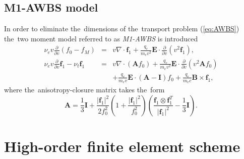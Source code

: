\documentclass[review]{elsarticle}
\newcommand{\pdv}[2]{\frac{\partial{#1}}{\partial{#2}}}
\newcommand{\vect}[1]{\boldsymbol{#1}}
\newcommand{\matr}[1]{\mathbf{#1}}
\newcommand{\nue}{\nu_{e}}
\newcommand{\nutot}{\nu_{t}}
\newcommand{\vmag}{v}
\newcommand{\E}{\vect{E}}
\newcommand{\B}{\vect{B}}
\newcommand{\qe}{q_e}
\newcommand{\me}{m_e}
\newcommand{\fM}{f_M}
\newcommand{\fzero}{f_0}
\newcommand{\fone}{\vect{f}_1}
\newcommand{\MI}{\matr{I}}
\newcommand{\MA}{\matr{A}}
\renewcommand{\refeq}[1]{(\ref{#1})}
\begin{document}
\subsection{M1-AWBS model}
In order to eliminate the~dimensions of the~transport problem \refeq{eq:AWBS}
the~two moment model referred to as \textit{M1-AWBS} is introduced
\begin{eqnarray}
  \nue\vmag\pdv{}{\vmag}\left(\fzero - \fM \right) &=&
  \vmag\nabla\cdot\fone + \frac{\qe}{\me\vmag^2}\E\cdot\pdv{}{\vmag}
  \left( \vmag^2 \fone\right) , 
  \label{eq:M1f0}\\
  \nue\vmag\pdv{}{\vmag}\fone - \nutot\fone &=& 
  \vmag\nabla\cdot\left(\MA\fzero\right) + 
  \frac{\qe}{\me\vmag^2}\E\cdot\pdv{}{\vmag}
  \left( \vmag^2 \MA\fzero\right) \nonumber\\
  && + \frac{\qe}{\me\vmag}\E\cdot\left( \MA - \MI \right)\fzero +
  \frac{\qe}{\me c}\B\times\fone ,
  \label{eq:M1f1}
\end{eqnarray}
where the~anisotropy-closure matrix takes the~form
\begin{equation}
  \MA = \frac{1}{3}\MI + \frac{|\fone|^2}{2\fzero^2}
  \left( 1 + \frac{|\fone|^2}{\fzero^2} \right)
  \left( \frac{\fone\otimes\fone^T}{|\fone|^2} - \frac{1}{3}\MI\right) .
\end{equation}
\section{High-order finite element scheme}\label{sec:hos}
\begin{comment}
\begin{eqnarray}
  \rho \pdv{\fzero}{\vmag} &=& 
  \frac{\rho}{\nue}\MI:\nabla\fone + 
  \frac{\qe\rho}{\me\nue\vmag}\E\cdot\pdv{\fone}{\vmag}
  + \frac{2 \qe\rho}{\me\nue\vmag^2}\E\cdot\fone + \rho \pdv{\fM}{\vmag} , 
  \label{eq:M1hosf0}\\
  \rho \pdv{\fone}{\vmag} &=&
  \nabla\cdot\left(\frac{\rho\MA}{\nue}\fzero\right) +
  \left(\frac{\qe\rho}{\me\nue\vmag^2}\E\cdot\left( 3\MA - \MI \right) - 
  \nabla\left( \frac{\rho}{\nue}\right)\cdot\MA \right)\fzero \nonumber\\
  &&+ \frac{\qe\rho}{\me\nue\vmag}\E\cdot\pdv{}{\vmag}
  \left( \MA\fzero\right) + \frac{\qe\rho}{\me c \nue\vmag}\B\times\fone + 
  \frac{\rho \nutot}{\nue\vmag}\fone .
  \label{eq:M1hosf1}
\end{eqnarray}
\end{comment}
\end{document}
